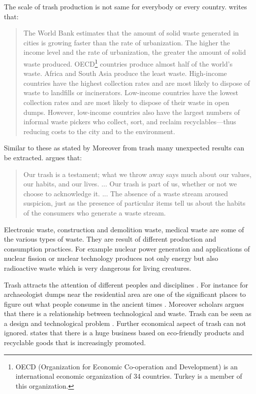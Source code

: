 The scale of trash production is not same for everybody or every country. \cite[2]{chen2015waste} writes that: 
\begin{quote}
The World Bank estimates that the amount of solid waste generated in cities is growing faster than the rate of urbanization. The higher the income level and the rate of urbanization, the greater the amount of solid waste produced. OECD\footnote{OECD (Organization for Economic Co-operation and Development) is an international economic organization of 34 countries. Turkey is a member of this organization.} countries produce almost half of the world’s waste. Africa and South Asia produce the least waste. High-income countries have the highest collection rates and are most likely to dispose of waste to landfills or incinerators. Low-income countries have the lowest collection rates and are most likely to dispose of their waste in open dumps. However, low-income countries also have the largest numbers of informal waste pickers who collect, sort, and reclaim recyclables---thus reducing costs to the city and to the environment.
\end{quote}

Similar to these as stated by \cite[16]{cerny1996recycled}  Moreover from trash many unexpected results can be extracted. \cite[xxv]{zimring2012encyclopedia} argues that:
\begin{quote}
Our trash is a testament; what we throw away says much about our values, our habits, and our lives. ... Our trash is part of us, whether or not we choose to acknowledge it. ... The absence of a waste stream aroused suspicion, just as the presence of particular items tell us about the habits of the consumers who generate a waste stream.
\end{quote}

Electronic waste, construction and demolition waste, medical waste are some of the various types of waste. They are result of different production and consumption practices. For example nuclear power generation and applications of nuclear fission or nuclear technology produces not only energy but also radioactive waste which is very dangerous for living creatures.

Trash attracts the attention of different peoples and disciplines  \citep[63]{emgin2012trashion}. For instance for archaeologist dumps near the residential area are one of the significant places to figure out what people consume in the ancient times \citep{rathje1992rubbish}. Moreover scholars argues that there is a relationship between technological and waste. Trash can be seen as a design and technological problem \citep{mcdonough2010cradle}. Further economical aspect of trash can not ignored. \cite[65]{emgin2012trashion} states that there is a huge business based on eco-friendly products and recyclable goods that is increasingly promoted.

